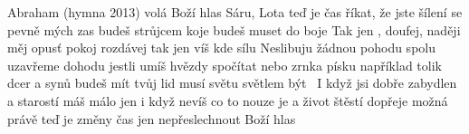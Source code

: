 \begin{TEXT}{Abraham (hymna 2013)}
\SLOKA {} volá Boží hlas\NL
{} Sáru, Lota teď je čas\NL
{} říkat, že jste šílení\NL
{} se pevně mých zas\NL
{} budeš strůjcem koje\NL
{} budeš muset do boje
\REFREN  Tak jen , doufej, naději měj\NL
{} opus\v{t} pokoj rozdávej\NL
tak jen  víš kde sílu 
\SLOKA Neslibuju žádnou pohodu\NL
spolu uzavřeme dohodu\NL
jestli umíš hvězdy spočítat\NL
nebo zrnka písku například\NL
tolik dcer a synů budeš mít\NL
tvůj lid musí světu světlem být
\REFRENHRAJ \,
\SLOKA I když jsi dobře zabydlen\NL
a starostí máš málo jen\NL
i když nevíš co to nouze je\NL
a život štěstí dopřeje\NL
možná právě te\v{d} je změny čas\NL
jen nepřeslechnout Boží hlas
\REFRENHRAJ \,
\end{TEXT}
